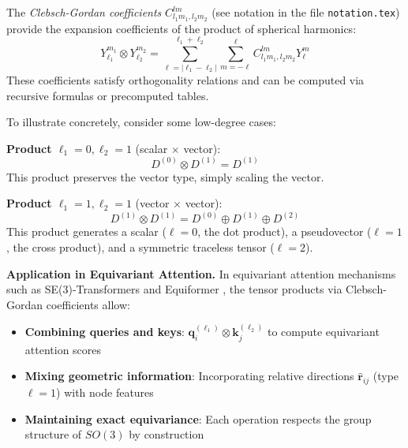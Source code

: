 \begin{definition}\label{def:clebsch_gordan_attention}
The \textit{Clebsch-Gordan coefficients} $C_{l_1 m_1, l_2 m_2}^{l m}$ (see notation in the file \texttt{notation.tex}) provide the expansion coefficients of the product of spherical harmonics:
\begin{equation}
Y_{\ell_1}^{m_1} \otimes Y_{\ell_2}^{m_2} = \sum_{\ell=|\ell_1-\ell_2|}^{\ell_1+\ell_2} \sum_{m=-\ell}^{\ell} C_{l_1 m_1, l_2 m_2}^{l m} Y_{\ell}^{m}
\label{eq:clebsch_gordan_expansion}
\end{equation}
These coefficients satisfy orthogonality relations and can be computed via recursive formulas or precomputed tables.
\end{definition}

\begin{example}\label{ex:low_degree_clebsch_gordan}
To illustrate concretely, consider some low-degree cases:

\textbf{Product $\ell_1 = 0, \ell_2 = 1$} (scalar $\times$ vector):
\begin{equation}
D^{(0)} \otimes D^{(1)} = D^{(1)}
\end{equation}
This product preserves the vector type, simply scaling the vector.

\textbf{Product $\ell_1 = 1, \ell_2 = 1$} (vector $\times$ vector):
\begin{equation}
D^{(1)} \otimes D^{(1)} = D^{(0)} \oplus D^{(1)} \oplus D^{(2)}
\end{equation}
This product generates a scalar ($\ell=0$, the dot product), a pseudovector ($\ell=1$, the cross product), and a symmetric traceless tensor ($\ell=2$).
\end{example}

\textbf{Application in Equivariant Attention.} In equivariant attention mechanisms such as SE(3)-Transformers \citep{fuchs2020se3transformers} and Equiformer \citep{liao2022equiformer}, the tensor products via Clebsch-Gordan coefficients allow:
\begin{itemize}
    \item \textbf{Combining queries and keys}: $\mathbf{q}_i^{(\ell_1)} \otimes \mathbf{k}_j^{(\ell_2)}$ to compute equivariant attention scores
    \item \textbf{Mixing geometric information}: Incorporating relative directions $\hat{\mathbf{r}}_{ij}$ (type $\ell=1$) with node features
    \item \textbf{Maintaining exact equivariance}: Each operation respects the group structure of $SO(3)$ by construction
\end{itemize}


